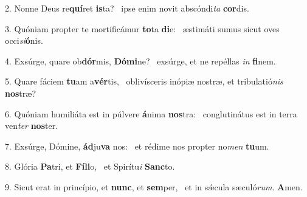2. Nonne Deus re\textbf{quí}ret \textbf{is}ta? \ast\  ipse enim novit abscóndi\textit{ta} \textbf{cor}dis.\

3. Quóniam propter te mortificámur \textbf{to}ta \textbf{di}e: \ast\  æstimáti sumus sicut oves occi\textit{si}\textbf{ó}nis.\

4. Exsúrge, quare ob\textbf{dór}mis, \textbf{Dó}\textbf{mi}ne? \ast\  exsúrge, et ne repéllas \textit{in} \textbf{fi}nem.\

5. Quare fáciem \textbf{tu}am a\textbf{vér}tis, \ast\  oblivísceris inópiæ nostræ, et tribulatió\textit{nis} \textbf{nos}træ?\

6. Quóniam humiliáta est in púlvere \textbf{á}nima \textbf{nos}tra: \ast\  conglutinátus est in terra ven\textit{ter} \textbf{nos}ter.\

7. Exsúrge, Dómine, \textbf{ád}ju\textbf{va} nos: \ast\  et rédime nos propter no\textit{men} \textbf{tu}um.\

8. Glória \textbf{Pa}tri, et \textbf{Fí}\textbf{li}o, \ast\  et Spirítu\textit{i} \textbf{Sanc}to.\

9. Sicut erat in princípio, et \textbf{nunc}, et \textbf{sem}per, \ast\  et in sǽcula sæculó\textit{rum}. \textbf{A}men.\

